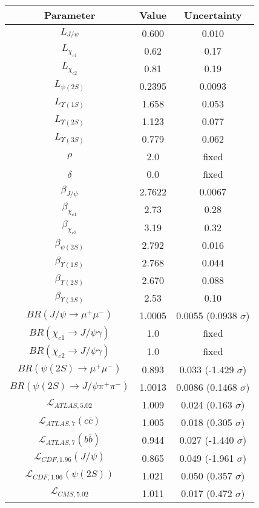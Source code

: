 \begin{table}[h!]
\centering
\begin{tabular}{c|c|c}
Parameter & Value & Uncertainty \\
\hline
$L_{J/\psi}$ & 0.600 & 0.010 \\
$L_{\chi_{c1}}$ & 0.62 & 0.17 \\
$L_{\chi_{c2}}$ & 0.81 & 0.19 \\
$L_{\psi(2S)}$ & 0.2395 & 0.0093 \\
$L_{\Upsilon(1S)}$ & 1.658 & 0.053 \\
$L_{\Upsilon(2S)}$ & 1.123 & 0.077 \\
$L_{\Upsilon(3S)}$ & 0.779 & 0.062 \\
$\rho$ & 2.0 & fixed \\
$\delta$ & 0.0 & fixed \\
$\beta_{J/\psi}$ & 2.7622 & 0.0067 \\
$\beta_{\chi_{c1}}$ & 2.73 & 0.28 \\
$\beta_{\chi_{c2}}$ & 3.19 & 0.32 \\
$\beta_{\psi(2S)}$ & 2.792 & 0.016 \\
$\beta_{\Upsilon(1S)}$ & 2.768 & 0.044 \\
$\beta_{\Upsilon(2S)}$ & 2.670 & 0.088 \\
$\beta_{\Upsilon(3S)}$ & 2.53 & 0.10 \\
$BR(J/\psi\rightarrow\mu^+\mu^-)$ & 1.0005 & 0.0055 (0.0938 $\sigma$) \\
$BR(\chi_{c1}\rightarrow J/\psi\gamma)$ & 1.0 & fixed \\
$BR(\chi_{c2}\rightarrow J/\psi\gamma)$ & 1.0 & fixed \\
$BR(\psi(2S)\rightarrow\mu^+\mu^-)$ & 0.893 & 0.033 (-1.429 $\sigma$) \\
$BR(\psi(2S)\rightarrow J/\psi\pi^+\pi^-)$ & 1.0013 & 0.0086 (0.1468 $\sigma$) \\
$\mathcal L_{ATLAS,5.02}$ & 1.009 & 0.024 (0.163 $\sigma$) \\
$\mathcal L_{ATLAS,7}(c\overline c)$ & 1.005 & 0.018 (0.305 $\sigma$) \\
$\mathcal L_{ATLAS,7}(b\overline b)$ & 0.944 & 0.027 (-1.440 $\sigma$) \\
$\mathcal L_{CDF,1.96}(J/\psi)$ & 0.865 & 0.049 (-1.961 $\sigma$) \\
$\mathcal L_{CDF,1.96}(\psi(2S))$ & 1.021 & 0.050 (0.357 $\sigma$) \\
$\mathcal L_{CMS,5.02}$ & 1.011 & 0.017 (0.472 $\sigma$) \\

\end{tabular}
\end{table}
